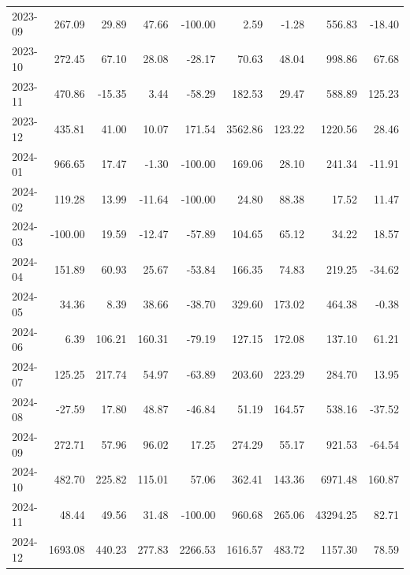 \begin{table}[ht]
\begin{tabular}{lrrrrrrrr}
  2023-09 & 267.09 & 29.89 & 47.66 & -100.00 & 2.59 & -1.28 & 556.83 & -18.40 \\ 
  2023-10 & 272.45 & 67.10 & 28.08 & -28.17 & 70.63 & 48.04 & 998.86 & 67.68 \\ 
  2023-11 & 470.86 & -15.35 & 3.44 & -58.29 & 182.53 & 29.47 & 588.89 & 125.23 \\ 
  2023-12 & 435.81 & 41.00 & 10.07 & 171.54 & 3562.86 & 123.22 & 1220.56 & 28.46 \\ 
  2024-01 & 966.65 & 17.47 & -1.30 & -100.00 & 169.06 & 28.10 & 241.34 & -11.91 \\ 
  2024-02 & 119.28 & 13.99 & -11.64 & -100.00 & 24.80 & 88.38 & 17.52 & 11.47 \\ 
  2024-03 & -100.00 & 19.59 & -12.47 & -57.89 & 104.65 & 65.12 & 34.22 & 18.57 \\ 
  2024-04 & 151.89 & 60.93 & 25.67 & -53.84 & 166.35 & 74.83 & 219.25 & -34.62 \\ 
  2024-05 & 34.36 & 8.39 & 38.66 & -38.70 & 329.60 & 173.02 & 464.38 & -0.38 \\ 
  2024-06 & 6.39 & 106.21 & 160.31 & -79.19 & 127.15 & 172.08 & 137.10 & 61.21 \\ 
  2024-07 & 125.25 & 217.74 & 54.97 & -63.89 & 203.60 & 223.29 & 284.70 & 13.95 \\ 
  2024-08 & -27.59 & 17.80 & 48.87 & -46.84 & 51.19 & 164.57 & 538.16 & -37.52 \\ 
  2024-09 & 272.71 & 57.96 & 96.02 & 17.25 & 274.29 & 55.17 & 921.53 & -64.54 \\ 
  2024-10 & 482.70 & 225.82 & 115.01 & 57.06 & 362.41 & 143.36 & 6971.48 & 160.87 \\ 
  2024-11 & 48.44 & 49.56 & 31.48 & -100.00 & 960.68 & 265.06 & 43294.25 & 82.71 \\ 
  2024-12 & 1693.08 & 440.23 & 277.83 & 2266.53 & 1616.57 & 483.72 & 1157.30 & 78.59 \\ 
   \hline
\end{tabular}
\end{table}
